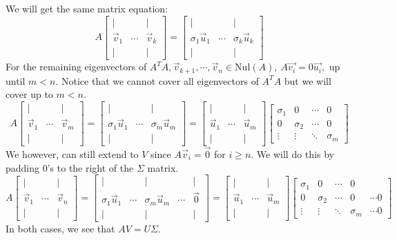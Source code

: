 \begin{enumerate}
{    We will get the same matrix equation:
    $$A \begin{bmatrix} | & \ & | \\
    \vec{v}_{1} & \cdots & \vec{v}_{k}  \\ | & \ & | \end{bmatrix} 
    =  \begin{bmatrix} | & \ & | \\ \sigma_{1} \vec{u}_{1} & \cdots & \sigma_{k} \vec{u}_{k} \\ | & \ & | \end{bmatrix}$$
    For the remaining eigenvectors of $A^{T}A, \vec{v}_{k + 1}, \cdots, \vec{v}_{n} \in \text{Nul}(A), \ A \vec{v_{i}} = 0 \vec{u_{i}},$ up until $m < n.$ Notice that we cannot cover all eigenvectors of $A^{T} A$ but we will cover up to $m < n.$
    $$A \begin{bmatrix} | & \ & | \\
    \vec{v}_{1} & \cdots & \vec{v}_{m}  \\ | & \ & | \end{bmatrix} = 
    \begin{bmatrix} | & \ & | \\ \sigma_{1} \vec{u}_{1} & \cdots & \sigma_{m} \vec{u}_{m} \\ | & \ & | \end{bmatrix} = 
     \begin{bmatrix} | & \ & | \\ \vec{u}_{1} & \cdots & \vec{u}_{m} \\ | & \ & | \end{bmatrix} \begin{bmatrix} \sigma_{1} & 0 &  \cdots & 0 \\ 0 & \sigma_{2} & \cdots & 0 \\ \vdots & \vdots & \ddots & \sigma_{m} \end{bmatrix}$$
    We however, can still extend to $V$ since $A \vec{v}_{i} = \vec{0}$ for $i \geq n.$ We will do this by padding $0$'s to the right of the $\Sigma$ matrix.
    $$A \begin{bmatrix} | & \ & | \\
    \vec{v}_{1} & \cdots & \vec{v}_{n}  \\ | & \ & | \end{bmatrix} = 
    \begin{bmatrix} | & \ & | &  & | \\ \sigma_{1} \vec{u}_{1} & \cdots & \sigma_{m} \vec{u}_{m} & \cdots & \vec{0} \\ | & \ & | &  & | \end{bmatrix} = 
     \begin{bmatrix} | & \ & | \\ \vec{u}_{1} & \cdots & \vec{u}_{m} \\ | & \ & | \end{bmatrix} \begin{bmatrix} \sigma_{1} & 0 &  \cdots & 0 \\ 0 & \sigma_{2} & \cdots & 0 & \cdots 0 \\ \vdots & \vdots & \ddots & \sigma_{m} & \cdots 0 \end{bmatrix}$$
    In both cases, we see that $AV = U\Sigma .$
  }


\end{enumerate}
